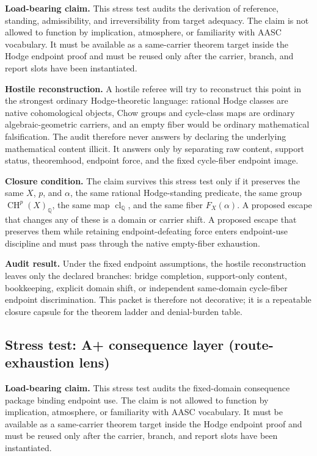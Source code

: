 \documentclass[11pt]{article}
\newcommand{\QQ}{\mathbb{Q}}
\newcommand{\CH}{\operatorname{CH}}
\newcommand{\clQ}{\operatorname{cl}_{\QQ}}
\begin{document}
\par\noindent\textbf{Load-bearing claim.} This stress test audits the derivation of reference, standing, admissibility, and irreversibility from target adequacy. The claim is not allowed to function by implication, atmosphere, or familiarity with AASC vocabulary. It must be available as a same-carrier theorem target inside the Hodge endpoint proof and must be reused only after the carrier, branch, and report slots have been instantiated.

\par\noindent\textbf{Hostile reconstruction.} A hostile referee will try to reconstruct this point in the strongest ordinary Hodge-theoretic language: rational Hodge classes are native cohomological objects, Chow groups and cycle-class maps are ordinary algebraic-geometric carriers, and an empty fiber would be ordinary mathematical falsification. The audit therefore never answers by declaring the underlying mathematical content illicit. It answers only by separating raw content, support status, theoremhood, endpoint force, and the fixed cycle-fiber endpoint image.

\par\noindent\textbf{Closure condition.} The claim survives this stress test only if it preserves the same $X$, $p$, and $\alpha$, the same rational Hodge-standing predicate, the same group $\CH^p(X)_\QQ$, the same map $\clQ$, and the same fiber $F_X(\alpha)$. A proposed escape that changes any of these is a domain or carrier shift. A proposed escape that preserves them while retaining endpoint-defeating force enters endpoint-use discipline and must pass through the native empty-fiber exhaustion.

\par\noindent\textbf{Audit result.} Under the fixed endpoint assumptions, the hostile reconstruction leaves only the declared branches: bridge completion, support-only content, bookkeeping, explicit domain shift, or independent same-domain cycle-fiber endpoint discrimination. This packet is therefore not decorative; it is a repeatable closure capsule for the theorem ladder and denial-burden table.


\subsection{Stress test: A+ consequence layer (route-exhaustion lens)}

\par\noindent\textbf{Load-bearing claim.} This stress test audits the fixed-domain consequence package binding endpoint use. The claim is not allowed to function by implication, atmosphere, or familiarity with AASC vocabulary. It must be available as a same-carrier theorem target inside the Hodge endpoint proof and must be reused only after the carrier, branch, and report slots have been instantiated.
\end{document}
